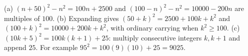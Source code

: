 (a) $(n+50)^2-n^2=100n+2500$ and $(100-n)^2-n^2=10000-200n$ are multiples of $100$. (b) Expanding gives $(50+k)^2=2500+100k+k^2$ and $(100+k)^2=10000+200k+k^2$, with ordinary carrying when $k^2\ge100$. (c) $(10k+5)^2=100k(k+1)+25$: multiply consecutive integers $k,k+1$ and append $25$. For example $95^2=100(9)(10)+25=9025$.
